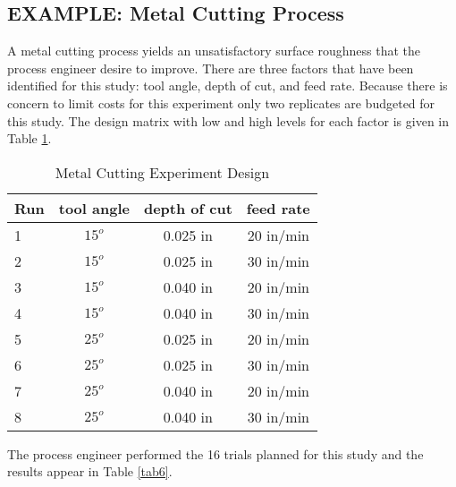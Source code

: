 \subsection{EXAMPLE: Metal Cutting Process}
A metal cutting process yields an unsatisfactory surface roughness that the process engineer desire to improve.  There are three factors that have been identified for this study: tool angle, depth of cut, and feed rate. Because there is concern to limit costs for this experiment only two replicates are budgeted for this study.  The design matrix with low and high levels for each factor is given in Table \ref{tab5}.
\begin{table}[h]\caption{Metal Cutting Experiment Design}\label{tab5}
\begin{center}
\begin{tabular}{|l|c|c|c|}
\hline Run & \textbf{tool angle} & \textbf{depth of cut} & \textbf{feed rate}\\ 
\hline 1 & $15^{o}$ & 0.025 in & 20 in/min \\ 
\hline 2 & $15^{o}$ & 0.025 in & 30 in/min \\ 
\hline 3 & $15^{o}$ & 0.040 in & 20 in/min \\ 
\hline 4 & $15^{o}$ & 0.040 in & 30 in/min \\
\hline 5 & $25^{o}$ & 0.025 in & 20 in/min \\
\hline 6 & $25^{o}$ & 0.025 in & 30 in/min \\
\hline 7 & $25^{o}$ & 0.040 in & 20 in/min \\
\hline 8 & $25^{o}$ & 0.040 in & 30 in/min \\ 
\hline 
\end{tabular} 
\end{center}
\end{table}
The process engineer performed the 16 trials planned for this study and the results appear in Table \ref{tab6}.
